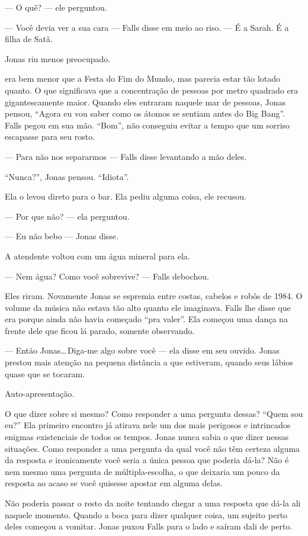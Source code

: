--- O quê? --- ele perguntou.

--- Você devia ver a sua cara --- Falls disse em meio ao riso. --- É a Sarah. É a filha de Satã.

Jonas riu menos preocupado.

 era bem menor que a Festa do Fim do Mundo, mas parecia estar tão lotado quanto. O que significava que a concentração de pessoas por metro quadrado era gigantescamente maior. Quando eles entraram naquele mar de pessoas, Jonas pensou, ``Agora eu vou saber como os átomos se sentiam antes do Big Bang''. Falls pegou em sua mão. ``Bom'', não conseguiu evitar a tempo que um sorriso escapasse para seu rosto.

--- Para não nos separarmos --- Falls disse levantando a mão deles.

``Nunca?'', Jonas pensou. ``Idiota''.

Ela o levou direto para o bar. Ela pediu alguma coisa, ele recusou.

--- Por que não? --- ela perguntou.

--- Eu não bebo --- Jonas disse.

A atendente voltou com um água mineral para ela.

--- Nem água? Como você sobrevive? --- Falls debochou.

Eles riram. Novamente Jonas se espremia entre costas, cabelos e robôs de 1984. O volume da música não estava tão alto quanto ele imaginava. Falls lhe disse que era porque ainda não havia começado ``pra valer''. Ela começou uma dança na frente dele que ficou lá parado, somente observando.

--- Então Jonas\ldots\,Diga-me algo sobre você --- ela disse\mudanca{,} em seu ouvido. Jonas prestou mais atenção na pequena distância a que estiveram, quando seus lábios quase que se tocaram.

Auto-apresentação.

O que dizer sobre si mesmo? Como responder a uma pergunta dessas? ``Quem sou eu?'' Ela primeiro encontro\mudanca{,} já atirava nele um dos mais perigosos e intrincados enigmas existenciais de todos os tempos. Jonas nunca sabia o que dizer nessas situações. Como responder a uma pergunta da qual você não têm certeza alguma da resposta e ironicamente você seria a única pessoa que poderia dá-la? Não é nem mesmo uma pergunta de múltipla-escolha, o que deixaria um pouco da resposta ao acaso se você quisesse apostar em alguma delas.

Não poderia passar o resto da noite tentando chegar a uma resposta que dá-la ali\mudanca{,} naquele momento. Quando  a boca para dizer qualquer coisa, um sujeito perto deles começou a vomitar. Jonas puxou Falls para o lado e saíram dali de perto.

